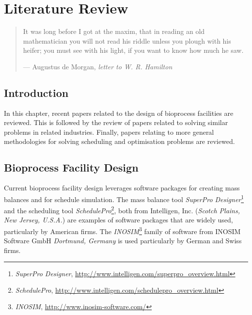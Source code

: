 %
%
%
%

\chapter{Literature Review}\label{C.litreview}

\begin{quote}
It was long before I got at the maxim, that in reading an old mathematician you
will not read his riddle unless you plough with his heifer; you must see with
his light, if you want to know how much he saw.

\hspace{2cm}--- Augustus de Morgan, \emph{letter to W. R. Hamilton}
\end{quote}

\section{Introduction}\label{S.intro2}

In this chapter, recent papers related to the design of bioprocess facilities
are reviewed.  This is followed by the review of papers related to solving
similar problems in related industries.  Finally, papers relating to more
general methodologies for solving scheduling and optimisation problems are
reviewed.

\section{Bioprocess Facility Design}\label{SS.bioprocdes}

Current bioprocess facility design leverages software packages for creating mass
balances and for schedule simulation.  The mass balance tool
\emph{SuperPro Designer\textsuperscript{\textregistered}}\footnote{
    \emph{SuperPro Designer\textsuperscript{\textregistered}},
    \url{http://www.intelligen.com/superpro_overview.html}} 
and the scheduling tool
\emph{SchedulePro\textsuperscript{\textregistered}}\footnote{
    \emph{SchedulePro\textsuperscript{\textregistered}},
    \url{http://www.intelligen.com/schedulepro_overview.html}},
both from Intelligen, Inc. (\emph{Scotch Plains, New Jersey, U.S.A.}) are
examples of software packages that are widely used, particularly by American
firms.
The \emph{INOSIM}\footnote{
        \emph{INOSIM}, \url{http://www.inosim-software.com/}} 
family of software from INOSIM Software GmbH
\emph{Dortmund, Germany} is used particularly by German and Swiss firms.

